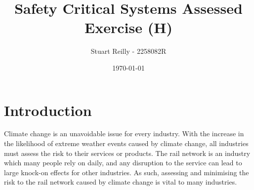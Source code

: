 \documentclass[11pt,a4]{article}
\author{Stuart Reilly - 2258082R}
\title{Safety Critical Systems Assessed Exercise (H)}
\date{\today}
\begin{document}
\maketitle
\tableofcontents

\pagebreak
{}
\section{Introduction}
Climate change is an unavoidable issue for every industry.
With the increase in the likelihood of extreme weather events caused by climate change,
all industries must assess the risk to their services or products.
The rail network is an industry which many people rely on daily, and any disruption to
the service can lead to large knock-on effects for other industries.
As such, assessing and minimising the risk to the rail network caused by climate change
is vital to many industries.
\end{document}
